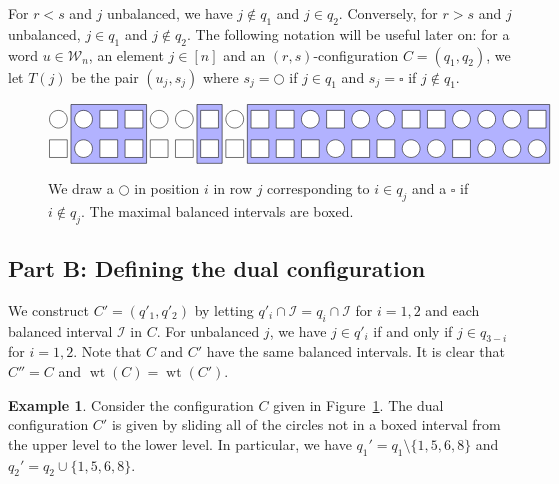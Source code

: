 \documentclass[reqno]{amsart}
\newcommand{\0}{\phantom{c}}
\DeclareMathOperator{\wt}{wt} %
\newcommand{\mcW}{\mathcal{W}}
\newcommand{\mcI}{\mathcal{I}}
\newcommand{\ive}[1]{\left[ #1 \right]}
\theoremstyle{plain}
\theoremstyle{definition}
\newtheorem{example}[thm]{Example}
\numberwithin{equation}{section}
\begin{document}
For $r < s$ and $j$ unbalanced, we have $j \notin q_1$ and $j \in q_2$.
Conversely, for $r > s$ and $j$ unbalanced, $j \in q_1$ and $j \notin q_2$.
The following notation will be useful later on: for a word $u \in \mcW_n$, an element $j \in \ive{n}$ and an $(r,s)$-configuration $C = (q_1, q_2)$, we let $T(j)$ be the pair $(u_j, s_j)$ where $s_j = \bigcirc$ if $j \in q_1$ and $s_j = \square$ if $j\notin q_1$.

\begin{figure}[t]
\[
\begin{tikzpicture}[scale=0.75]
  \def\sc{0.85}   %
  \def\ll{2}   %
  \def\l{1}   %
  \draw[fill=blue!30] (1.5*\sc,\l-.5) rectangle(4.5*\sc,\ll+.5);
  \draw[fill=blue!30] (6.5*\sc,\l-.5) rectangle(7.5*\sc,\ll+.5);
  \draw[fill=blue!30] (8.5*\sc,\l-.5) rectangle(20.5*\sc,\ll+.5);
  \foreach \i in {1,2,5,6,8,11,13,14,17,18,19} { \draw[fill=white] (\i*\sc,\ll) circle (0.3); }
  \foreach \i in {3,4,7,9,10,12,15,16,20} { \draw[fill=white] (\i*\sc-.3,\ll-.3) rectangle +(0.6,+0.6); }
  \foreach \i in {2,12,15,16,18,19,20} { \draw[fill=white] (\i*\sc,\l) circle (0.3); }
  \foreach \i in {1,3,4,5,6,7,8,9,10,11,13,14,17} { \draw[fill=white] (\i*\sc-.3,\l-.3) rectangle +(0.6,+0.6); }
\end{tikzpicture}
\]
\caption{We draw a $\bigcirc$ in position $i$ in row $j$ corresponding to $i \in q_j$ and a $\square$ if $i \notin q_j$.
The maximal balanced intervals are boxed.}
\label{fig:balanced}
\end{figure}


\subsection*{Part B: Defining the dual configuration}

We construct $C' = (q'_1, q'_2)$ by letting $q'_i \cap \mcI = q_i \cap \mcI$ for $i=1,2$ and each balanced interval $\mcI$ in $C$.
For unbalanced $j$, we have $j \in q'_i$ if and only if $j \in q_{3-i}$ for $i = 1,2$.
Note that $C$ and $C'$ have the same balanced intervals.
It is clear that $C'' = C$ and $\wt(C) = \wt(C')$.

\begin{example}
Consider the configuration $C$ given in Figure~\ref{fig:balanced}.
The dual configuration $C'$ is given by sliding all of the circles not in a boxed interval from the upper level to the lower level.
In particular, we have $q_1' = q_1 \setminus \{1,5,6,8\}$ and $q_2' = q_2 \cup \{1,5,6,8\}$.
\end{example}
\end{document}
